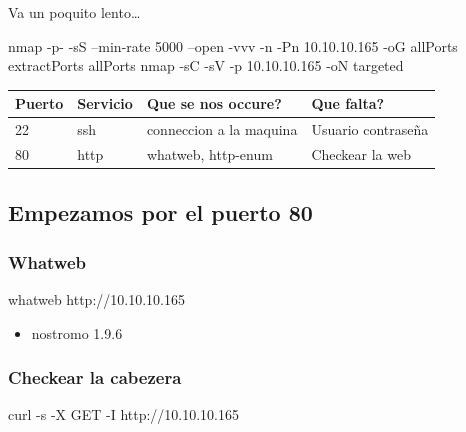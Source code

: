 \documentclass{assets/ipesethesis}
\newenvironment{Shaded}{\begin{snugshade}}{\end{snugshade}}
\newcommand{\ExtensionTok}[1]{#1}
\newcommand{\FunctionTok}[1]{\textcolor[rgb]{0.00,0.00,0.00}{#1}}
\newcommand{\NormalTok}[1]{#1}
\providecommand{\tightlist}{%
  \setlength{\itemsep}{0pt}\setlength{\parskip}{0pt}}
\begin{document}
Va un poquito lento\ldots{}

\begin{Shaded}
\begin{Highlighting}[]
\FunctionTok{nmap}\NormalTok{ -p- -sS --min-rate 5000 --open -vvv -n -Pn 10.10.10.165 -oG allPorts}
\ExtensionTok{extractPorts}\NormalTok{ allPorts}
\FunctionTok{nmap}\NormalTok{ -sC -sV -p 10.10.10.165 -oN targeted}
\end{Highlighting}
\end{Shaded}

\begin{longtable}[]{@{}llll@{}}
\toprule
Puerto & Servicio & Que se nos occure? & Que falta?\tabularnewline
\midrule
\endhead
22 & ssh & conneccion a la maquina & Usuario contraseña\tabularnewline
80 & http & whatweb, http-enum & Checkear la web\tabularnewline
\bottomrule
\end{longtable}

\hypertarget{empezamos-por-el-puerto-80-1}{%
\subsection*{Empezamos por el puerto 80}\label{empezamos-por-el-puerto-80-1}}

\hypertarget{whatweb-1}{%
\subsubsection*{Whatweb}\label{whatweb-1}}

\begin{Shaded}
\begin{Highlighting}[]
\ExtensionTok{whatweb}\NormalTok{ http://10.10.10.165}
\end{Highlighting}
\end{Shaded}

\begin{itemize}
\tightlist
\item
  nostromo 1.9.6
\end{itemize}

\hypertarget{checkear-la-cabezera}{%
\subsubsection*{Checkear la cabezera}\label{checkear-la-cabezera}}

\begin{Shaded}
\begin{Highlighting}[]
\ExtensionTok{curl}\NormalTok{ -s -X GET -I http://10.10.10.165}
\end{Highlighting}
\end{Shaded}
\end{document}
